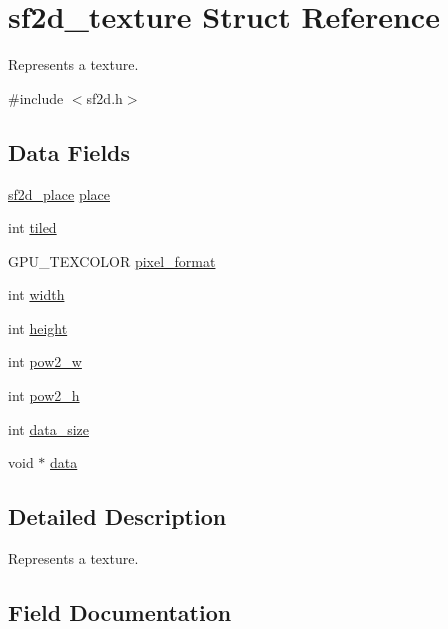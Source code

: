\hypertarget{structsf2d__texture}{}\section{sf2d\+\_\+texture Struct Reference}
\label{structsf2d__texture}


Represents a texture.  




{\ttfamily \#include $<$sf2d.\+h$>$}

\subsection*{Data Fields}
\begin{DoxyCompactItemize}
\item 
\hyperlink{sf2d_8h_a07951fad547d423a4cf6521c2e5171ea}{sf2d\+\_\+place} \hyperlink{structsf2d__texture_ac30cfc2de337739d1a19858e4fdacaa4}{place}
\item 
int \hyperlink{structsf2d__texture_a4a66a4712612cc5e3f5cdff7d0e604ec}{tiled}
\item 
G\+P\+U\+\_\+\+T\+E\+X\+C\+O\+L\+O\+R \hyperlink{structsf2d__texture_a247bd65d7ab9db17fdd8bd78b17cba23}{pixel\+\_\+format}
\item 
int \hyperlink{structsf2d__texture_a312abd0ee8ab587825804132c136b253}{width}
\item 
int \hyperlink{structsf2d__texture_a055ccacd41038339dd1ded72747ccf8f}{height}
\item 
int \hyperlink{structsf2d__texture_aa1c5388828ad6d18ea37eb2e6ace7f48}{pow2\+\_\+w}
\item 
int \hyperlink{structsf2d__texture_a644c43b5fde6e12c8f1e3cb0280798e1}{pow2\+\_\+h}
\item 
int \hyperlink{structsf2d__texture_a99107fa90e683bab6456da738ff9d005}{data\+\_\+size}
\item 
void $\ast$ \hyperlink{structsf2d__texture_a46673c7ce439c63554a23e6ce83b254f}{data}
\end{DoxyCompactItemize}


\subsection{Detailed Description}
Represents a texture. 

\subsection{Field Documentation}
\hypertarget{structsf2d__texture_a46673c7ce439c63554a23e6ce83b254f}{}
